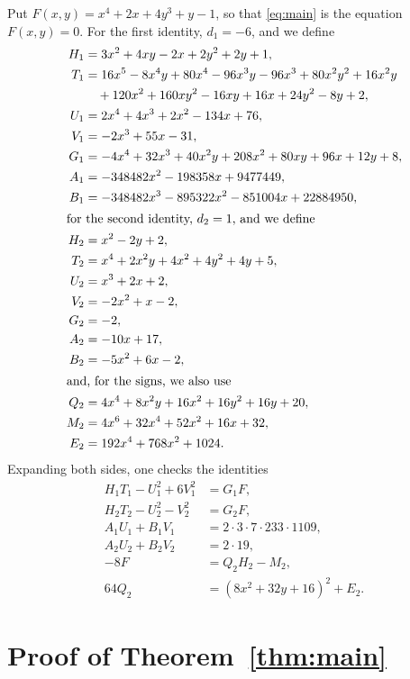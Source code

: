 \documentclass[11pt]{article}
\begin{document}
Put $F(x,y)=x^{4}+2x+4y^{3}+y-1$, so that \eqref{eq:main} is the equation $F(x,y)=0$.
For the first identity, $d_{1}=-6$, and we define
\begin{align*}
H_{1}&=3x^{2}+4xy-2x+2y^{2}+2y+1,\\
T_{1}&=16x^{5}-8x^{4}y+80x^{4}-96x^{3}y-96x^{3}+80x^{2}y^{2}+16x^{2}y\\
&\quad+120x^{2}+160xy^{2}-16xy+16x+24y^{2}-8y+2,\\
U_{1}&=2x^{4}+4x^{3}+2x^{2}-134x+76,\\
V_{1}&=-2x^{3}+55x-31,\\
G_{1}&=-4x^{4}+32x^{3}+40x^{2}y+208x^{2}+80xy+96x+12y+8,\\
A_{1}&=-348482x^{2}-198358x+9477449,\\
B_{1}&=-348482x^{3}-895322x^{2}-851004x+22884950,\\
\intertext{for the second identity, $d_{2}=1$, and we define}
H_{2}&=x^{2}-2y+2,\\
T_{2}&=x^{4}+2x^{2}y+4x^{2}+4y^{2}+4y+5,\\
U_{2}&=x^{3}+2x+2,\\
V_{2}&=-2x^{2}+x-2,\\
G_{2}&=-2,\\
A_{2}&=-10x+17,\\
B_{2}&=-5x^{2}+6x-2,\\
\intertext{and, for the signs, we also use}
Q_{2}&=4x^{4}+8x^{2}y+16x^{2}+16y^{2}+16y+20,\\
M_{2}&=4x^{6}+32x^{4}+52x^{2}+16x+32,\\
E_{2}&=192x^{4}+768x^{2}+1024.
\end{align*}
Expanding both sides, one checks the identities
\begin{align}
H_{1}T_{1}-U_{1}^2+6V_{1}^2&=G_{1}F,\label{eq:norm1}\\
H_{2}T_{2}-U_{2}^2-V_{2}^2&=G_{2}F,\label{eq:norm2}\\
A_{1}U_{1}+B_{1}V_{1}&=2\cdot 3\cdot 7\cdot 233\cdot 1109,\label{eq:bez1}\\
A_{2}U_{2}+B_{2}V_{2}&=2\cdot 19,\label{eq:bez2}\\
-8F&=Q_{2}H_{2}-M_{2},\label{eq:sign2}\\
64Q_{2}&=(8x^{2}+32y+16)^2+E_{2}.\label{eq:sign2b}
\end{align}

\section{Proof of Theorem~\ref{thm:main}}
\end{document}

